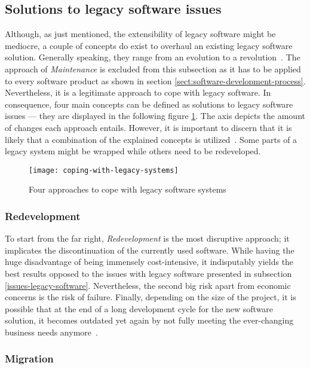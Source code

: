 \documentclass[12pt,a4paper,twoside]{report}
\begin{document}
\subsection{Solutions to legacy software issues} \label{solutions-issues-legacy-software}

Although, as just mentioned, the extensibility of legacy software might be mediocre,
a couple of concepts do exist to overhaul an existing legacy software solution.
Generally speaking, they range from an evolution to a revolution~\cite{bisbal-legacy-issues}.
The approach of \textit{Maintenance} is excluded from this subsection as it
has to be applied to every software product as shown in section \ref{sect:software-development-process}.
Nevertheless, it is a legitimate approach to cope with legacy software.
In consequence, four main concepts can be defined as solutions to legacy software issues ---
they are displayed in the following figure \ref{fig:coping-legacy}.
The axis depicts the amount of changes each approach entails.
However, it is important to discern that it is likely that a combination of
the explained concepts is utilized~\cite{bisbal-legacy-issues}.
Some parts of a legacy system might be wrapped while others need to be redeveloped.
\begin{figure}[htbp]
\centering
\texttt{[image: coping-with-legacy-systems]}
\caption{Four approaches to cope with legacy software systems~\cite{bisbal-legacy-issues}}
\label{fig:coping-legacy}
\end{figure}


\subsubsection{Redevelopment}

To start from the far right, \textit{Redevelopment} is the most disruptive approach;
it implicates the discontinuation of the currently used software.
While having the huge disadvantage of being immensely cost-intensive, it indisputably
yields the best results opposed to the issues with legacy software presented in
subsection \ref{issues-legacy-software}.
Nevertheless, the second big risk apart from economic concerns is
the risk of failure.
Finally, depending on the size of the project, it is possible that at the end
of a long development cycle for the new software solution, it becomes outdated
yet again by not fully meeting the ever-changing
business needs anymore~\cite{stevens-software-reengineering-patterns}.


\subsubsection{Migration}
\end{document}
